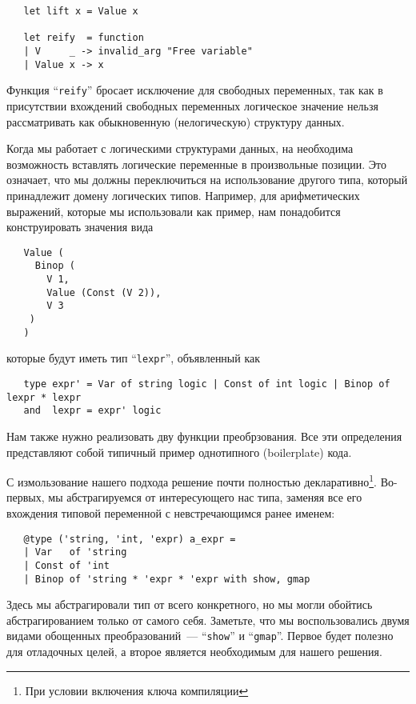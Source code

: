 \begin{lstlisting}
   let lift x = Value x
  
   let reify  = function
   | V     _ -> invalid_arg "Free variable"
   | Value x -> x
\end{lstlisting}

Функция ``\lstinline{reify}'' бросает исключение для свободных переменных, так как в присутствии вхождений свободных переменных
логическое значение нельзя рассматривать как обыкновенную (нелогическую) структуру данных.

Когда мы работает с логическими структурами данных, на необходима возможность вставлять логические переменные в произвольные позиции.
Это означает, что мы должны переключиться на использование другого типа, который принадлежит домену логических типов. Например,
для арифметических выражений, которые мы использовали как пример, нам понадобится конструировать значения вида

\begin{lstlisting}
   Value (
     Binop (
       V 1, 
       Value (Const (V 2)),
       V 3
    )
   )
\end{lstlisting}

которые будут иметь тип ``\lstinline{lexpr}'', объявленный как

\begin{lstlisting}
   type expr' = Var of string logic | Const of int logic | Binop of lexpr * lexpr
   and  lexpr = expr' logic
\end{lstlisting}

Нам также нужно реализовать дву функции преобрзования. Все эти определения представляют собой типичный пример однотипного (boilerplate) кода.

С измользование нашего подхода решение почти полностью декларативно\footnote{При условии включения ключа компиляции }.
Во-первых, мы абстрагируемся от интересующего нас типа, заменяя все его вхождения типовой переменной с невстречающимся ранее именем:

\begin{lstlisting}
   @type ('string, 'int, 'expr) a_expr =
   | Var   of 'string
   | Const of 'int
   | Binop of 'string * 'expr * 'expr with show, gmap
\end{lstlisting}

Здесь мы абстрагировали тип от всего конкретного, но мы могли обойтись абстрагированием только от самого себя. Заметьте, что 
мы воспользовались двумя видами обощенных преобразований~--- ``\lstinline{show}'' и ``\lstinline{gmap}''. 
Первое будет полезно для отладочных целей, а второе является необходимым для нашего решения.

